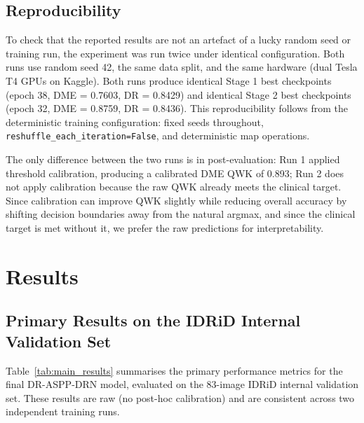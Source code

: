 \documentclass[12pt,a4paper]{article}
\begin{document}
\subsection{Reproducibility}

To check that the reported results are not an artefact of a lucky random seed or training run, the experiment was run twice under identical configuration. Both runs use random seed 42, the same data split, and the same hardware (dual Tesla T4 GPUs on Kaggle). Both runs produce identical Stage 1 best checkpoints (epoch 38, DME = 0.7603, DR = 0.8429) and identical Stage 2 best checkpoints (epoch 32, DME = 0.8759, DR = 0.8436). This reproducibility follows from the deterministic training configuration: fixed seeds throughout, \texttt{reshuffle\_each\_iteration=False}, and deterministic map operations.

The only difference between the two runs is in post-evaluation: Run 1 applied threshold calibration, producing a calibrated DME QWK of 0.893; Run 2 does not apply calibration because the raw QWK already meets the clinical target. Since calibration can improve QWK slightly while reducing overall accuracy by shifting decision boundaries away from the natural argmax, and since the clinical target is met without it, we prefer the raw predictions for interpretability.

\section{Results}

\subsection{Primary Results on the IDRiD Internal Validation Set}

Table~\ref{tab:main_results} summarises the primary performance metrics for the final DR-ASPP-DRN model, evaluated on the 83-image IDRiD internal validation set. These results are raw (no post-hoc calibration) and are consistent across two independent training runs.
\end{document}
